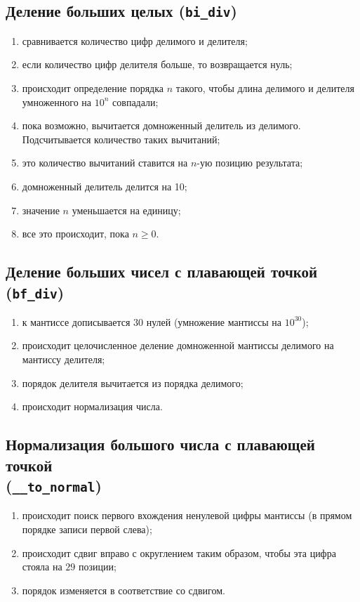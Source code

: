 \documentclass[a4paper,12pt]{extarticle}
\begin{document}
\subsection{Деление больших целых (\texttt{bi\_div})}
\begin{enumerate}
    \item сравнивается количество цифр делимого и делителя;
    \item если количество цифр делителя больше, то возвращается нуль;
    \item происходит определение порядка $n$ такого, чтобы длина делимого и делителя умноженного на $10^n$ совпадали;
    \item пока возможно, вычитается домноженный делитель из делимого. Подсчитывается количество таких вычитаний;
    \item это количество вычитаний ставится на $n$-ую позицию результата;
    \item домноженный делитель делится на 10;
    \item значение $n$ уменьшается на единицу;
    \item все это происходит, пока $n \geq 0$.
\end{enumerate}

\subsection{Деление больших чисел с плавающей точкой (\texttt{bf\_div})}
\begin{enumerate}
    \item к мантиссе дописывается $30$ нулей (умножение мантиссы на $10^{30}$);
    \item происходит целочисленное деление домноженной мантиссы делимого на мантиссу делителя;
    \item порядок делителя вычитается из порядка делимого;
    \item происходит нормализация числа.
\end{enumerate}

\subsection{Нормализация большого числа с плавающей точкой \\ (\texttt{\_\_to\_normal})}
\begin{enumerate}
    \item происходит поиск первого вхождения ненулевой цифры мантиссы (в прямом порядке записи первой слева);
    \item происходит сдвиг вправо с округлением таким образом, чтобы эта цифра стояла на $29$ позиции;
    \item порядок изменяется в соответствие со сдвигом.
\end{enumerate}
\end{document}
